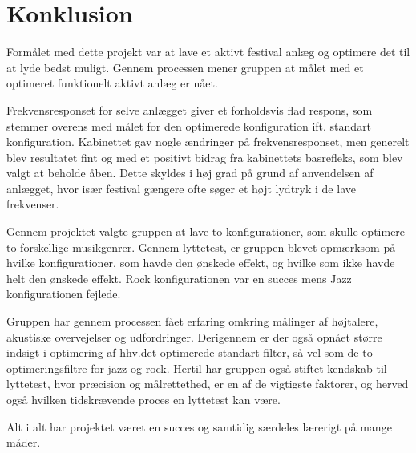 \section{Konklusion}
Formålet med dette projekt var at lave et aktivt festival anlæg og optimere det til at lyde bedst muligt. Gennem processen mener gruppen at målet med et optimeret funktionelt aktivt anlæg er nået. 

Frekvensresponset for selve anlægget giver et forholdsvis flad respons, som stemmer overens med målet for den optimerede konfiguration   ift.  standart konfiguration. Kabinettet gav nogle ændringer på frekvensresponset,  men generelt blev resultatet fint og med et positivt bidrag fra kabinettets basrefleks, som blev valgt at beholde åben. Dette skyldes i høj grad på grund af anvendelsen af anlægget, hvor især festival gængere ofte søger et højt lydtryk i de lave frekvenser.

Gennem projektet valgte gruppen at lave to konfigurationer, som skulle optimere to forskellige musikgenrer. Gennem lyttetest, er gruppen blevet opmærksom på hvilke konfigurationer, som havde den ønskede effekt, og hvilke som ikke havde helt den ønskede effekt. Rock konfigurationen var en succes mens Jazz konfigurationen fejlede.    

Gruppen har gennem processen fået erfaring omkring målinger af højtalere, akustiske overvejelser og udfordringer. Derigennem er der også opnået større indsigt i optimering af hhv.det optimerede standart filter, så vel som de to optimeringsfiltre for jazz og rock.
Hertil har gruppen også stiftet kendskab til lyttetest, hvor præcision og målrettethed, er en af de vigtigste faktorer, og herved også hvilken tidskrævende proces en lyttetest kan være.  

Alt i alt har projektet været en succes og samtidig særdeles lærerigt på mange måder.